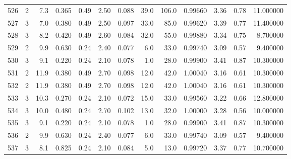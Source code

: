 \begin{tabular}{lrrrrrrrrrrrr}
526  &        2 &            7.3 &             0.365 &         0.49 &            2.50 &      0.088 &                 39.0 &                 106.0 &  0.99660 &  3.36 &       0.78 &  11.000000 \\
527  &        3 &            7.0 &             0.380 &         0.49 &            2.50 &      0.097 &                 33.0 &                  85.0 &  0.99620 &  3.39 &       0.77 &  11.400000 \\
528  &        3 &            8.2 &             0.420 &         0.49 &            2.60 &      0.084 &                 32.0 &                  55.0 &  0.99880 &  3.34 &       0.75 &   8.700000 \\
529  &        2 &            9.9 &             0.630 &         0.24 &            2.40 &      0.077 &                  6.0 &                  33.0 &  0.99740 &  3.09 &       0.57 &   9.400000 \\
530  &        3 &            9.1 &             0.220 &         0.24 &            2.10 &      0.078 &                  1.0 &                  28.0 &  0.99900 &  3.41 &       0.87 &  10.300000 \\
531  &        2 &           11.9 &             0.380 &         0.49 &            2.70 &      0.098 &                 12.0 &                  42.0 &  1.00040 &  3.16 &       0.61 &  10.300000 \\
532  &        2 &           11.9 &             0.380 &         0.49 &            2.70 &      0.098 &                 12.0 &                  42.0 &  1.00040 &  3.16 &       0.61 &  10.300000 \\
533  &        3 &           10.3 &             0.270 &         0.24 &            2.10 &      0.072 &                 15.0 &                  33.0 &  0.99560 &  3.22 &       0.66 &  12.800000 \\
534  &        3 &           10.0 &             0.480 &         0.24 &            2.70 &      0.102 &                 13.0 &                  32.0 &  1.00000 &  3.28 &       0.56 &  10.000000 \\
535  &        3 &            9.1 &             0.220 &         0.24 &            2.10 &      0.078 &                  1.0 &                  28.0 &  0.99900 &  3.41 &       0.87 &  10.300000 \\
536  &        2 &            9.9 &             0.630 &         0.24 &            2.40 &      0.077 &                  6.0 &                  33.0 &  0.99740 &  3.09 &       0.57 &   9.400000 \\
537  &        3 &            8.1 &             0.825 &         0.24 &            2.10 &      0.084 &                  5.0 &                  13.0 &  0.99720 &  3.37 &       0.77 &  10.700000 \\

\end{tabular}
